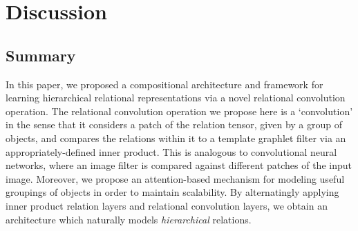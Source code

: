 
\section{Discussion}\label{sec:discussion}
\subsection*{Summary}
In this paper, we proposed a compositional architecture and framework for learning hierarchical relational representations via a novel relational convolution operation. The relational convolution operation we propose here is a `convolution' in the sense that it considers a patch of the relation tensor, given by a group of objects, and compares the relations within it to a template graphlet filter via an appropriately-defined inner product. This is analogous to convolutional neural networks, where an image filter is compared against different patches of the input image. Moreover, we propose an attention-based mechanism for modeling useful groupings of objects in order to maintain scalability. By alternatingly applying inner product relation layers and relational convolution layers, we obtain an architecture which naturally models \textit{hierarchical} relations.



